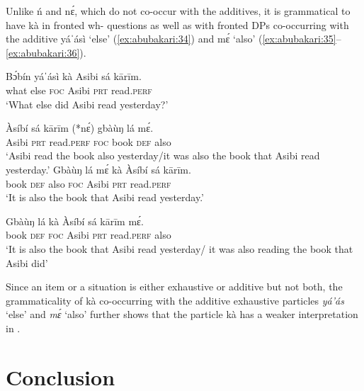 \documentclass[output=paper,modfonts,nonflat,
 hidelinks
]{langsci/langscibook}
\begin{document}
Unlike ń and nɛ́, which do not co-occur with the  additives, it is grammatical to have kà in fronted wh- questions as well as with fronted DPs co-occurring with the  additive yáˈásì ‘else’  (\ref{ex:abubakari:34}) and mɛ́ ‘also’ (\ref{ex:abubakari:35}--\ref{ex:abubakari:36}).

\ea\label{ex:abubakari:33}
\gll Bɔ́bín		yáˈásì	kà	Asibi	sá	kārīm.\\
what		else	\textsc{foc}	Asibi	\textsc{prt}	read.\textsc{perf}\\
\glt ‘What else did Asibi read yesterday?’
\z

\ea\label{ex:abubakari:34}
\gll Àsíbí		sá	kārīm		(*nɛ́)	gbàùŋ	lá	mɛ́.\\
Asibi	\textsc{prt}	read.\textsc{perf}	\textsc{foc}	book	\textsc{def} also\\
\glt ‘Asibi read the book also yesterday/it was also the book       
                       that Asibi read yesterday.’
\z
\ea\label{ex:abubakari:35}
\gll	Gbàùŋ	lá	mɛ́	kà	Àsíbí	sá	kārīm.\\
book		\textsc{def}	also	\textsc{foc}	Asibi	\textsc{prt}	read.\textsc{perf}\\
\glt ‘It is also the book that Asibi read yesterday.’
\z

\ea\label{ex:abubakari:36}
\gll Gbàùŋ	lá	kà	Àsíbí	sá	kārīm	mɛ́.\\	
book	\textsc{def}	\textsc{foc}	Asibi	\textsc{prt}	read.\textsc{perf}	also\\
\glt ‘It is also the book that Asibi read yesterday/ it was also reading the book that Asibi did’
\z

Since an item or a situation is either exhaustive or additive but not both, the grammaticality of kà co-occurring with the additive exhaustive particles \textit{yá’ás} ‘else’ and \textit{mɛ́} ‘also’ further shows that the particle kà has a weaker  interpretation in . 


\section{Conclusion}
\end{document}
